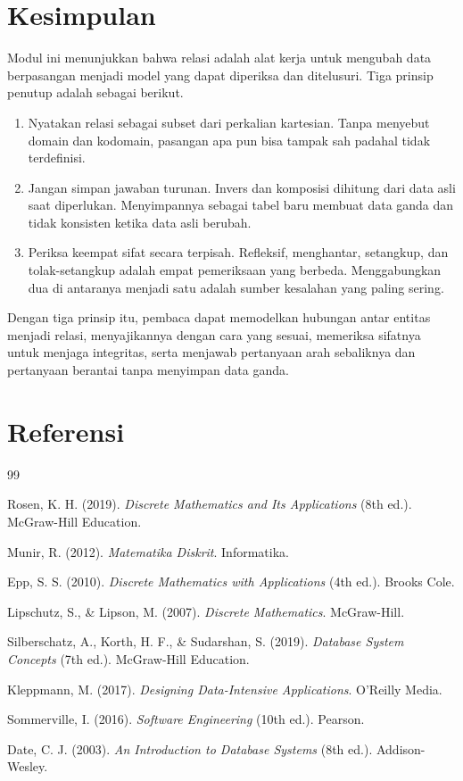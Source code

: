 \documentclass[11pt,a4paper]{article}
\begin{document}
\section{Kesimpulan}

Modul ini menunjukkan bahwa relasi adalah alat kerja untuk mengubah data berpasangan menjadi model yang dapat diperiksa dan ditelusuri. Tiga prinsip penutup adalah sebagai berikut.

\begin{enumerate}
	\item Nyatakan relasi sebagai subset dari perkalian kartesian. Tanpa menyebut domain dan kodomain, pasangan apa pun bisa tampak sah padahal tidak terdefinisi.
	\item Jangan simpan jawaban turunan. Invers dan komposisi dihitung dari data asli saat diperlukan. Menyimpannya sebagai tabel baru membuat data ganda dan tidak konsisten ketika data asli berubah.
	\item Periksa keempat sifat secara terpisah. Refleksif, menghantar, setangkup, dan tolak-setangkup adalah empat pemeriksaan yang berbeda. Menggabungkan dua di antaranya menjadi satu adalah sumber kesalahan yang paling sering.
\end{enumerate}

Dengan tiga prinsip itu, pembaca dapat memodelkan hubungan antar entitas menjadi relasi, menyajikannya dengan cara yang sesuai, memeriksa sifatnya untuk menjaga integritas, serta menjawab pertanyaan arah sebaliknya dan pertanyaan berantai tanpa menyimpan data ganda.

\newpage
\section*{Referensi}

\begin{thebibliography}{99}

	Rosen, K. H. (2019).
	\textit{Discrete Mathematics and Its Applications} (8th ed.).
	McGraw-Hill Education.

	Munir, R. (2012).
	\textit{Matematika Diskrit}.
	Informatika.

	Epp, S. S. (2010).
	\textit{Discrete Mathematics with Applications} (4th ed.).
	Brooks Cole.

	Lipschutz, S., \& Lipson, M. (2007).
	\textit{Discrete Mathematics}.
	McGraw-Hill.

	Silberschatz, A., Korth, H. F., \& Sudarshan, S. (2019).
	\textit{Database System Concepts} (7th ed.).
	McGraw-Hill Education.

	Kleppmann, M. (2017).
	\textit{Designing Data-Intensive Applications}.
	O'Reilly Media.

	Sommerville, I. (2016).
	\textit{Software Engineering} (10th ed.).
	Pearson.

	Date, C. J. (2003).
	\textit{An Introduction to Database Systems} (8th ed.).
	Addison-Wesley.

\end{thebibliography}
\end{document}
